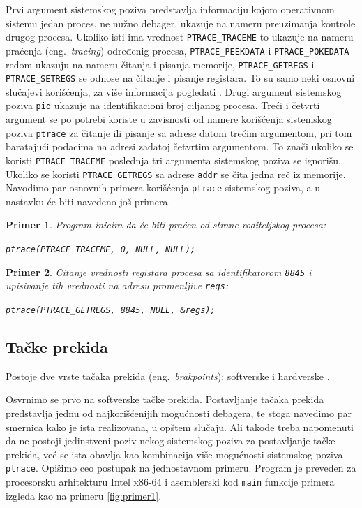 \documentclass[12pt,oneside]{memoir}
\newtheorem{primer}{Primer}
\begin{document}
Prvi argument sistemskog poziva predstavlja informaciju kojom operativnom sistemu jedan proces, ne nužno debager, ukazuje na nameru preuzimanja kontrole drugog procesa. Ukoliko isti ima vrednost \texttt{PTRACE\_TRACEME} to ukazuje na nameru praćenja (eng.~\emph{tracing}) određenig procesa, \texttt{PTRACE\_PEEKDATA} i \texttt{PTRACE\_POKEDATA} redom ukazuju na nameru čitanja i pisanja  memorije, \texttt{PTRACE\_GETREGS} i \texttt{PTRACE\_SETREGS} se odnose na čitanje i pisanje registara. To su samo neki osnovni slučajevi korišćenja, za više informacija pogledati \cite{ptrace}. Drugi argument sistemskog poziva \texttt{pid} ukazuje na identifikacioni broj ciljanog procesa. Treći i četvrti argument se po potrebi koriste u zavisnosti od namere korišćenja sistemskog poziva \texttt{ptrace} za čitanje ili pisanje sa adrese datom trećim argumentom, pri tom baratajući podacima na adresi zadatoj četvrtim argumentom. To znači ukoliko se koristi \texttt{PTRACE\_TRACEME} poslednja tri argumenta sistemskog poziva se ignorišu. Ukoliko se koristi \texttt{PTRACE\_GETREGS} sa adrese \texttt{addr} se čita jedna reč iz memorije. Navodimo par osnovnih primera korišćenja \texttt{ptrace} sistemskog poziva, a u nastavku će biti navedeno još primera.

\begin{primer}
Program inicira da će biti praćen od strane roditeljskog procesa:

\texttt{ptrace(PTRACE\_TRACEME, 0, NULL, NULL);}
\end{primer}

\begin{primer}
Čitanje vrednosti registara procesa sa identifikatorom \texttt{8845} i upisivanje tih vrednosti na adresu promenljive \texttt{regs}:

\texttt{ptrace(PTRACE\_GETREGS, 8845, NULL, \&regs);}

\end{primer}

\subsection{Tačke prekida}

Postoje dve vrste tačaka prekida (eng.~\emph{brakpoints}): softverske i hardverske \cite{GDB}.

Osvrnimo se prvo na softverske tačke prekida. Postavljanje tačaka prekida predstavlja jednu od najkorišćenijih mogućnosti debagera, te stoga navedimo par smernica kako je ista realizovana, u opštem slučaju. Ali takođe treba napomenuti da ne postoji jedinstveni poziv nekog sistemskog poziva za postavljanje tačke prekida, već se ista obavlja kao kombinacija više mogućnosti  sistemskog poziva \texttt{ptrace}. Opišimo ceo postupak na jednostavnom primeru. Program je preveden za procesorsku arhitekturu Intel x86-64 i asemblerski kod \texttt{main} funkcije primera izgleda kao na primeru \ref{fig:primer1}.
\end{document}
